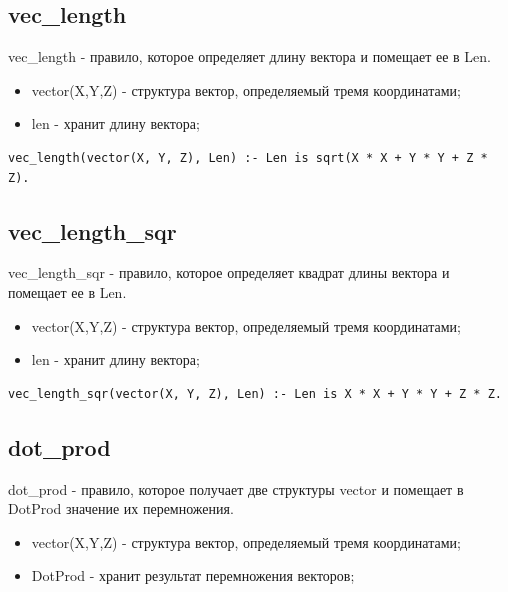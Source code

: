 \subsection{vec\_length}
\hspace{0.6cm} vec\_length - правило, которое определяет длину вектора и помещает ее в Len.

\begin{itemize}
	\item vector(X,Y,Z) - структура вектор, определяемый тремя координатами;
	\item len - хранит длину вектора;
\end{itemize}

\begin{lstlisting}[caption=Реализация правила vec\_length, label=rules:veclength]
vec_length(vector(X, Y, Z), Len) :- Len is sqrt(X * X + Y * Y + Z * Z).
\end{lstlisting}

\subsection{vec\_length\_sqr}

\hspace{0.6cm} vec\_length\_sqr - правило, которое определяет квадрат длины вектора и помещает ее в Len.

\begin{itemize}
	\item vector(X,Y,Z) - структура вектор, определяемый тремя координатами;
	\item len - хранит длину вектора;
\end{itemize}

\begin{lstlisting}[caption=Реализация правила vec\_length\_sqr, label=rules:veclengthsqr]
vec_length_sqr(vector(X, Y, Z), Len) :- Len is X * X + Y * Y + Z * Z.
\end{lstlisting}

\subsection{dot\_prod}
\hspace{0.6cm} dot\_prod - правило, которое получает две структуры vector и помещает в DotProd значение их перемножения.

\begin{itemize}
	\item vector(X,Y,Z) - структура вектор, определяемый тремя координатами;
	\item DotProd - хранит результат перемножения векторов;
\end{itemize}

